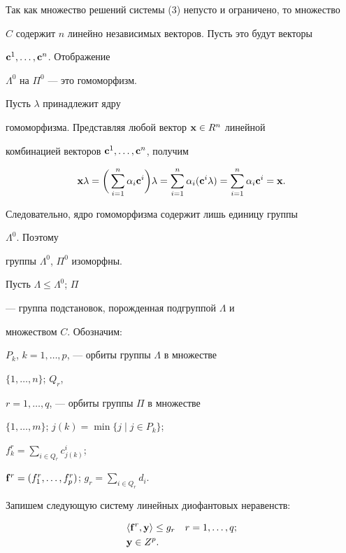 \begin{pf}


Так как множество решений системы (3) непусто и ограничено, то множество


$C$ содержит $n$ линейно независимых векторов. Пусть это будут векторы


$\bold c^1,\dotsc,\bold c^n$. Отображение


$\Lambda^0$ на $\Pi^0$ --- это гомоморфизм.


Пусть $\lambda$ принадлежит ядру


гомоморфизма. Представляя любой вектор $\bold x\in R^n$ линейной


комбинацией векторов $\bold c^1,\dotsc,\bold c^n$, получим


$$


\bold x\lambda=\biggl(\,\sum^n_{i=1}\alpha_i\bold c^i\biggr)\lambda


=\sum^n_{i=1}\alpha_i(\bold c^i\lambda)=


\sum^n_{i=1}\alpha_i\bold c^i=\bold x.


$$


Следовательно, ядро гомоморфизма содержит лишь единицу группы


$\Lambda^0$. Поэтому


группы $\Lambda^0$, $\Pi^0$ изоморфны.


\end{pf}





Пусть $\Lambda\le\Lambda^0$; $\Pi$


--- группа подстановок, порожденная подгруппой $\Lambda$ и


множеством $C$. Обозначим:


$P_k$, $k=1,\dotsc,p$, --- орбиты группы $\Lambda$ в множестве


$\{1,\dotsc,n\}$; $Q_r$,


$r=1,\dotsc,q$, --- орбиты группы $\Pi$ в множестве


$\{1,\dotsc,m\}$; $j(k)=\min\{j\mid j\in P_k\}$;


$f^r_k=\sum\limits_{i\in Q_r}c^i_{j(k)}$;


$\bold f^r=(f^r_1,\dotsc,f^r_p)$; $g_r=\sum\limits_{i\in Q_r}d_i$.





Запишем следующую систему линейных диофантовых неравенств:


\begin{align}


&\la\bold f^r,\bold y\ra\le g_r\quad r=1,\dotsc,q;\\


&\bold y\in Z^p.


\end{align}





